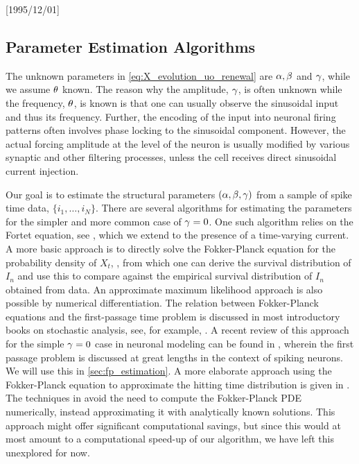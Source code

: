 \NeedsTeXFormat{LaTeX2e}[1995/12/01] \documentclass[10pt]{bmc_article}
\newenvironment{bmcformat}{\begin{raggedright}\baselineskip20pt\sloppy\setboolean{publ}{false}}{\end{raggedright}\baselineskip20pt\sloppy}
\begin{document}
\begin{bmcformat}
\section{Parameter Estimation Algorithms}
\label{sec:estimation_algos}
The unknown parameters in \cref{eq:X_evolution_uo_renewal} are ${\alpha},{\beta}$ and ${\gamma }$,
while we assume ${\theta}$ known. The reason why the amplitude, ${\gamma }$, is often
unknown while the frequency, ${\theta}$, is known is that one can usually observe the
sinusoidal input and thus its frequency. Further, the encoding of the input into
neuronal firing patterns often involves phase locking to the sinusoidal
component. However, the actual forcing amplitude at the level of the neuron is
usually modified by various synaptic and other filtering processes, unless the
cell receives direct sinusoidal current injection.

Our goal is to estimate the structural parameters $({{\alpha},{\beta},{\gamma } })$ from a sample of
spike time data, $\{i_1,\ldots,i_N\}$. There are several algorithms for
estimating the parameters for the simpler and more common case of ${\gamma } = 0$. One
such algorithm relies on the Fortet equation, see
\cite{Ditlevsen2008,Ditlevsen2007}, which we extend to the presence of a
time-varying current. A more basic approach is to directly solve the
Fokker-Planck equation for the probability density of $X_t$,
\cite{Sirovich2011a,Paninski2004,Dong2011}, from which one can derive the
survival distribution of $I_n$ and use this to compare against the empirical
survival distribution of $I_n$ obtained from data. An approximate maximum
likelihood approach is also possible by numerical differentiation. The relation
between Fokker-Planck equations and the first-passage time problem is discussed
in most introductory books on stochastic analysis, see, for example,
\cite{Jacobs}. A recent review of this approach for the simple ${\gamma }=0$ case in
neuronal modeling can be found in \cite{Sirovich2011a}, wherein the first
passage problem is discussed at great lengths in the context of spiking neurons.
We will use this in \cref{sec:fp_estimation}. A more elaborate approach using
the Fokker-Planck equation to approximate the hitting time distribution is given
in \cite{Lo2006}. The techniques in \cite{Lo2006} avoid the need to compute the
Fokker-Planck PDE numerically, instead approximating it with analytically known
solutions. This approach might offer significant computational savings, but
since this would at most amount to a computational speed-up of our algorithm, we
have left this unexplored for now.



\end{bmcformat}
\end{document}
